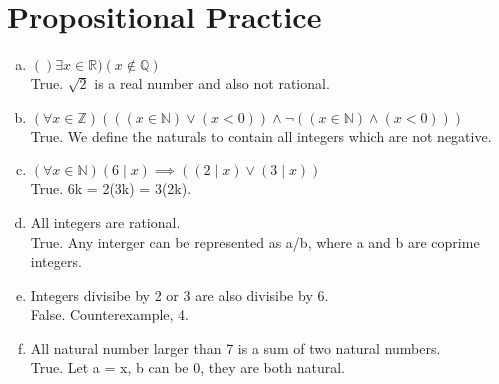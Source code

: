 \documentclass{article}
\begin{document}
\part*{Propositional Practice}
    \begin{enumerate}[(a).]
        \item 
        $()\exists x \in \mathbb{R})(x \notin \mathbb{Q})$\\
        True. $\sqrt{2}$ is a real number and also not rational.
        \item $(\forall x \in \mathbb{Z})(((x \in \mathbb{N}) \vee (x < 0)) \wedge
         \neg ((x \in \mathbb{N}) \wedge (x < 0)))$\\
        True. We define the naturals to contain all integers which are not negative.
        \item $(\forall x \in \mathbb{N})(6 \mid x) \implies ((2 \mid x) \vee (3 \mid x))$\\
        True. 6k = 2(3k) = 3(2k).
        \item All integers are rational.\\
        True. Any interger can be represented as a/b, where a and b are coprime integers.
        \item Integers divisibe by 2 or 3 are also divisibe by 6.\\
        False. Counterexample, 4.
        \item All natural number larger than 7 is a sum of two natural numbers.\\
        True. Let a = x, b can be 0, they are both natural.
        
    \end{enumerate}
\end{document}
